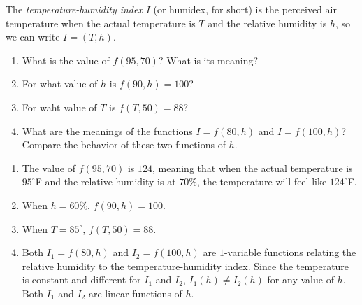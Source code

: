 \begin{exercise}
	The \textit{temperature-humidity index} $I$ (or humidex, for short) is the perceived air temperature when the actual temperature is $T$ and the relative humidity is $h$, so we can write $I = \left( T, h \right)$.
	\renewcommand{\labelenumi}{(\alph{enumi})}
	\begin{enumerate}
		\item What is the value of $f\left( 95, 70 \right)$? What is its meaning?
		\item For what value of $h$ is $f\left( 90, h \right) = 100$?
		\item For waht value of $T$ is $f\left( T, 50 \right) = 88$?
		\item What are the meanings of the functions $I = f\left( 80, h \right)$ and $I = f\left( 100, h \right)$? Compare the behavior of these two functions of $h$.
	\end{enumerate}
\end{exercise}
\begin{solution}
	{\color{white}{content...}}
	\renewcommand{\labelenumi}{(\alph{enumi})}
	\begin{enumerate}
		\item The value of $f\left( 95, 70 \right)$ is $124$, meaning that when the actual temperature is $95^{\circ}$F and the relative humidity is at $70\%$, the temperature will feel like $124^{\circ}$F.
		\item When $h = 60\%$, $f\left( 90, h \right) = 100$.
		\item When $T = 85^{\circ}$, $f\left( T, 50 \right) = 88$.
		\item Both $I_1 = f\left( 80, h \right)$ and $I_2 = f\left( 100, h \right)$ are $1$-variable functions relating the relative humidity to the temperature-humidity index. Since the temperature is constant and different for $I_1$ and $I_2$, $I_1\left( h \right) \neq I_2\left( h \right)$ for any value of $h$. Both $I_1$ and $I_2$ are linear functions of $h$.
	\end{enumerate}
\end{solution}
